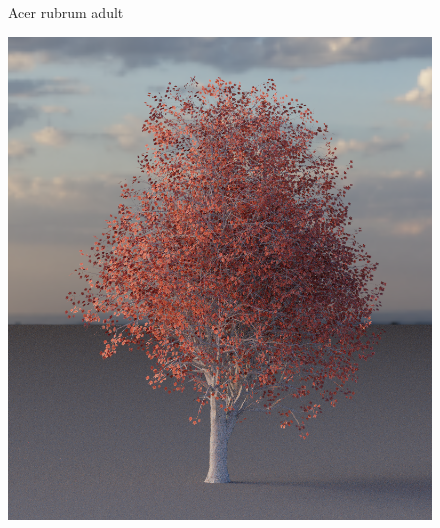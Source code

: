 \begin{figure}[t]
\begin{center}
        \begin{minipage}[c]{0.24\textwidth}
            \begin{flushleft}
                Acer rubrum adult
            \end{flushleft}
        \end{minipage}
        \begin{minipage}[c]{0.24\textwidth}
            \includegraphics[valign=c, width=\linewidth]{img/EA01a_mesh.png}
        \end{minipage}
        \begin{minipage}[c]{0.24\textwidth}

\end{minipage}
\end{center}
\end{figure}
